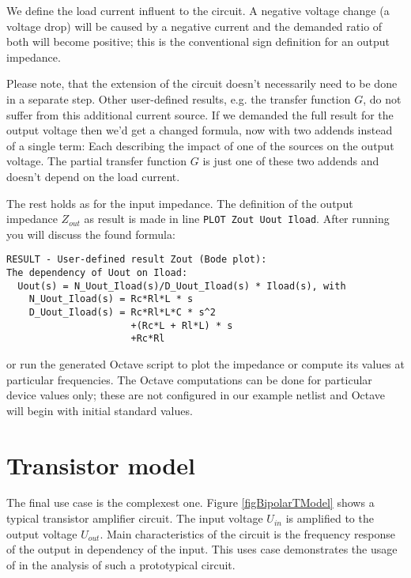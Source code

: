 We define the load current influent to the circuit. A negative voltage
change (a voltage drop) will be caused by a negative current and the
demanded ratio of both will become positive; this is the conventional sign
definition for an output impedance.

Please note, that the extension of the circuit doesn't necessarily need to
be done in a separate step. Other user-defined  results, e.g.
the transfer function $G$, do not suffer from this additional current
source. If we demanded the full result for the output voltage then we'd
get a changed formula, now with two addends instead of a single term: Each
describing the impact of one of the sources on the output voltage. The
partial transfer function $G$ is just one of these two addends and doesn't
depend on the load current.

The rest holds as for the input impedance. The definition of the output
impedance $Z_{out}$ as \linnet{} result is made in line
\verb+PLOT Zout Uout Iload+. After running \linnet{} you will discuss the found formula:
\begin{verbatim}
RESULT - User-defined result Zout (Bode plot):
The dependency of Uout on Iload:
  Uout(s) = N_Uout_Iload(s)/D_Uout_Iload(s) * Iload(s), with
    N_Uout_Iload(s) = Rc*Rl*L * s
    D_Uout_Iload(s) = Rc*Rl*L*C * s^2
                      +(Rc*L + Rl*L) * s
                      +Rc*Rl
\end{verbatim}
or run the generated Octave script  to plot the impedance or
compute its values at particular frequencies. The Octave computations can
be done for particular device values only; these are not configured in
our example netlist and Octave will begin with initial standard values.


\section{Transistor model}

The final use case is the complexest one. Figure \ref{figBipolarTModel}
shows a typical transistor amplifier circuit. The input voltage $U_{in}$
is amplified to the output voltage $U_{out}$. Main characteristics of the
circuit is the frequency response of the output in dependency of the
input. This uses case demonstrates the usage of \linnet{} in the analysis
of such a prototypical circuit.


